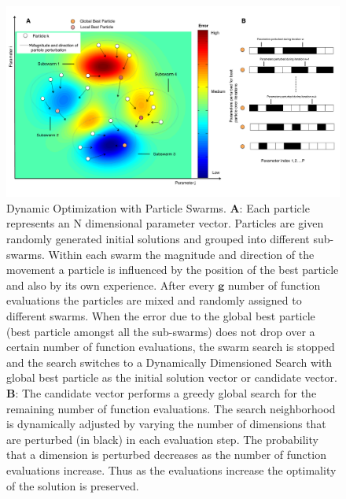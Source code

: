 \documentclass[12pt]{article}
\begin{document}
\begin{figure}[h]
\centering
\includegraphics[width=1.0\textwidth]{./figs/Figure_1_Algorithm.pdf}
\caption{Dynamic Optimization with Particle Swarms. \textbf{A}: Each particle represents an N dimensional parameter vector. Particles are given randomly generated initial solutions and grouped into different sub-swarms. Within each swarm the magnitude and direction of the movement a particle is influenced by the position of the best particle and also by its own experience. After every $\mathbf{g}$ number of function evaluations the particles are mixed and randomly assigned to different swarms. When the error due to the global best particle (best particle amongst all the sub-swarms) does not drop over a certain number of function evaluations, the swarm search is stopped and the search switches to a Dynamically Dimensioned Search with global best particle as the initial solution vector or candidate vector.
\textbf{B}: The candidate vector performs a greedy global search for the remaining number of function evaluations. The search neighborhood is dynamically adjusted by varying the number of dimensions that are perturbed (in black) in each evaluation step. The probability that a dimension is perturbed decreases as the number of function evaluations increase. Thus as the evaluations increase the optimality of the solution is preserved.
}\label{fig-algorithm}
\end{figure}

\clearpage
\end{document}
